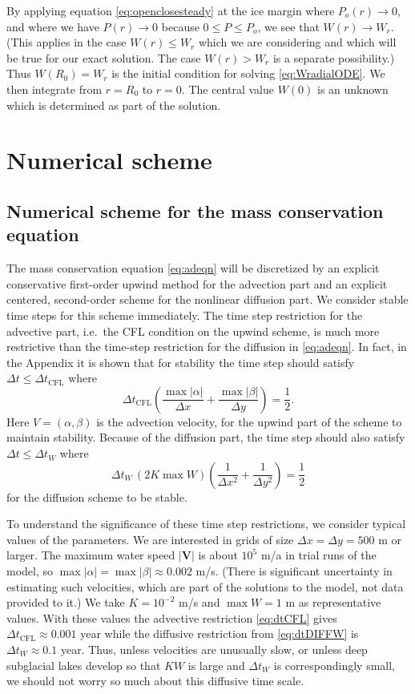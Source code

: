 \documentclass[11pt,final]{amsart}%
\newcommand\bV{\mathbf{V}}
\begin{document}
By applying equation \eqref{eq:openclosesteady} at the ice margin where $P_o(r)\to 0$, and where we have $P(r)\to 0$ because $0 \le P \le P_o$, we see that $W(r)\to W_r$.  (This applies in the case $W(r)\le W_r$ which we are considering and which will be true for our exact solution.  The case $W(r)>W_r$ is a separate possibility.)  Thus $W(R_0)=W_r$ is the initial condition for solving \eqref{eq:WradialODE}.  We then integrate from $r=R_0$ to $r=0$.  The central value $W(0)$ is an unknown which is determined as part of the solution.


\section{Numerical scheme}  \label{sec:num}

\subsection*{Numerical scheme for the mass conservation equation}  The mass conservation equation \eqref{eq:adeqn} will be discretized by an explicit conservative first-order upwind method for the advection part and an explicit centered, second-order scheme for the nonlinear diffusion part.  We consider stable time steps for this scheme immediately.  The time step restriction for the advective part, i.e.~the CFL condition on the upwind scheme, is much more restrictive than the time-step restriction for the diffusion in \eqref{eq:adeqn}.  In fact, in the Appendix it is shown that for stability the time step should satisfy $\Delta t \le \Delta t_{\text{CFL}}$ where
\begin{equation}
\Delta t_{\text{CFL}} \left(\frac{\max |\alpha|}{\Delta x} + \frac{\max |\beta|}{\Delta y}\right) = \frac{1}{2}. \label{eq:dtCFL}
\end{equation}
Here $V=(\alpha,\beta)$ is the advection velocity, for the upwind part of the scheme to maintain stability.  Because of the diffusion part, the time step should also satisfy $\Delta t \le \Delta t_{W}$ where
\begin{equation}
\Delta t_W\, (2 K \max W) \left(\frac{1}{\Delta x^2} + \frac{1}{\Delta y^2}\right) = \frac{1}{2} \label{eq:dtDIFFW}
\end{equation}
for the diffusion scheme to be stable.

To understand the significance of these time step restrictions, we consider typical values of the parameters.  We are interested in grids of size $\Delta x = \Delta y = 500$ m or larger.  The maximum water speed $|\bV|$ is about $10^5$ m/a in trial runs of the model, so $\max |\alpha| = \max |\beta| \approx 0.002$ m/s.  (There is significant uncertainty in estimating such velocities, which are part of the solutions to the model, not data provided to it.)  We take $K=10^{-2}$ m/s and $\max W=1$ m as representative values.  With these values the advective restriction \eqref{eq:dtCFL} gives $\Delta t_{\text{CFL}} \approx 0.001$ year while the diffusive restriction from \eqref{eq:dtDIFFW} is $\Delta t_W \approx 0.1$ year.  Thus, unless velocities are unusually slow, or unless deep subglacial lakes develop so that $KW$ is large and $\Delta t_W$ is correspondingly small, we should not worry so much about this diffusive time scale.
\end{document}
